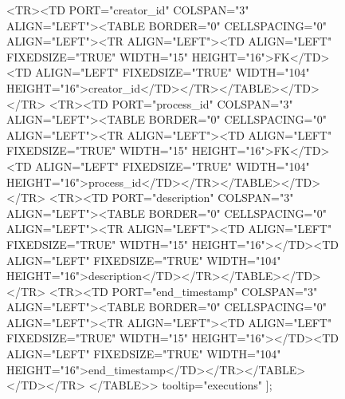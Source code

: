 \begin{figure}[t]
{      <TR><TD PORT="creator_id" COLSPAN="3" ALIGN="LEFT"><TABLE BORDER="0" CELLSPACING="0" ALIGN="LEFT"><TR ALIGN="LEFT"><TD ALIGN="LEFT" FIXEDSIZE="TRUE" WIDTH="15" HEIGHT="16">FK</TD><TD ALIGN="LEFT" FIXEDSIZE="TRUE" WIDTH="104" HEIGHT="16">creator_id</TD></TR></TABLE></TD></TR>
      <TR><TD PORT="process_id" COLSPAN="3" ALIGN="LEFT"><TABLE BORDER="0" CELLSPACING="0" ALIGN="LEFT"><TR ALIGN="LEFT"><TD ALIGN="LEFT" FIXEDSIZE="TRUE" WIDTH="15" HEIGHT="16">FK</TD><TD ALIGN="LEFT" FIXEDSIZE="TRUE" WIDTH="104" HEIGHT="16">process_id</TD></TR></TABLE></TD></TR>
      <TR><TD PORT="description" COLSPAN="3" ALIGN="LEFT"><TABLE BORDER="0" CELLSPACING="0" ALIGN="LEFT"><TR ALIGN="LEFT"><TD ALIGN="LEFT" FIXEDSIZE="TRUE" WIDTH="15" HEIGHT="16"></TD><TD ALIGN="LEFT" FIXEDSIZE="TRUE" WIDTH="104" HEIGHT="16">description</TD></TR></TABLE></TD></TR>
      <TR><TD PORT="end_timestamp" COLSPAN="3" ALIGN="LEFT"><TABLE BORDER="0" CELLSPACING="0" ALIGN="LEFT"><TR ALIGN="LEFT"><TD ALIGN="LEFT" FIXEDSIZE="TRUE" WIDTH="15" HEIGHT="16"></TD><TD ALIGN="LEFT" FIXEDSIZE="TRUE" WIDTH="104" HEIGHT="16">end_timestamp</TD></TR></TABLE></TD></TR>
    </TABLE>>
    tooltip="executions"
  ];

}
\end{figure}
